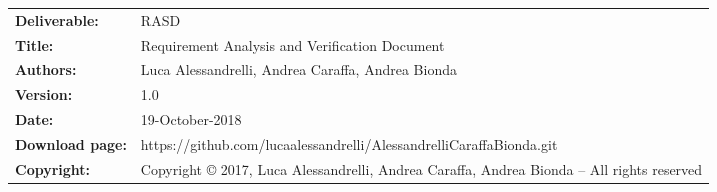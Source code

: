 \begin{table}[h!]
\begin{tabu} to \textwidth { X[0.3,r,p] X[0.7,l,p] }
\hline

\textbf{Deliverable:} & RASD\\
\textbf{Title:} & Requirement Analysis and Verification Document \\
\textbf{Authors:} & Luca Alessandrelli, Andrea Caraffa, Andrea Bionda \\
\textbf{Version:} & 1.0 \\ 
\textbf{Date:} & 19-October-2018 \\
\textbf{Download page:} & https://github.com/lucaalessandrelli/AlessandrelliCaraffaBionda.git \\
\textbf{Copyright:} & Copyright © 2017, Luca Alessandrelli, Andrea Caraffa, Andrea Bionda – All rights reserved \\
\hline
\end{tabu}
\end{table}




\setcounter{page}{2}


\newpage
{}
\tableofcontents
\newpage
{}
\listoffigures
{}
\listoftables

\clearpage
{}
\label{sect:introduction}


\clearpage
{}
\label{sect:overview}


\clearpage
{}
\label{sect:requirements}


